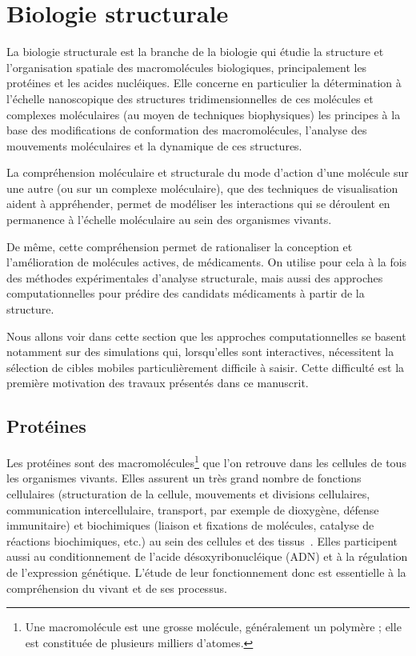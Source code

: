 	\section{Biologie structurale}
	La biologie structurale est la branche de la biologie qui étudie la structure et l'organisation spatiale des macromolécules biologiques, principalement les protéines et les acides nucléiques. Elle concerne en particulier la détermination à l'échelle nanoscopique des structures tridimensionnelles de ces molécules et complexes moléculaires (au moyen de techniques biophysiques) les principes à la base des modifications de conformation des macromolécules, l'analyse des mouvements moléculaires et la dynamique de ces structures.

La compréhension moléculaire et structurale du mode d'action d'une molécule sur une autre (ou sur un complexe moléculaire), que des techniques de visualisation aident à appréhender, permet de modéliser les interactions qui se déroulent en permanence à l'échelle moléculaire au sein des organismes vivants.

De même, cette compréhension permet de rationaliser la conception et l'amélioration de molécules actives, de médicaments. On utilise pour cela à la fois des méthodes expérimentales d'analyse structurale, mais aussi des approches computationnelles pour prédire des candidats médicaments à partir de la structure.

Nous allons voir dans cette section que les approches computationnelles se basent notamment sur des simulations qui, lorsqu'elles sont interactives, nécessitent la sélection de cibles mobiles particulièrement difficile à saisir. Cette difficulté est la première motivation des travaux présentés dans ce manuscrit.
	
	\subsection{Protéines}
	Les protéines sont des macromolécules\footnote{Une macromolécule est une \og grosse \fg{} molécule, généralement un polymère ; elle est constituée de plusieurs milliers d'atomes.} que l'on retrouve dans les cellules de tous les organismes vivants. Elles assurent un très grand nombre de fonctions cellulaires (structuration de la cellule, mouvements et divisions cellulaires, communication intercellulaire, transport, par exemple de dioxygène, défense immunitaire) et biochimiques (liaison et fixations de molécules, catalyse de réactions biochimiques, etc.) au sein des cellules et des tissus~\cite{lodish2004molecular}. Elles participent aussi au conditionnement de l'acide désoxyribonucléique (ADN) et à la régulation de l'expression génétique. L'étude de leur fonctionnement donc est essentielle à la compréhension du vivant et de ses processus.
	
